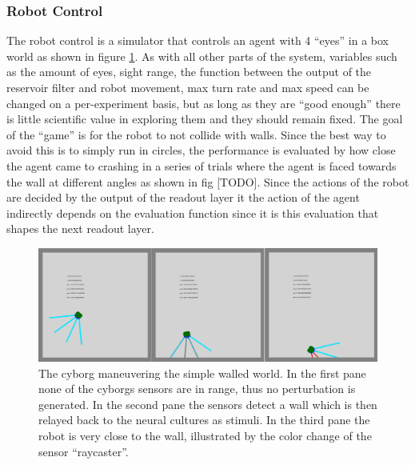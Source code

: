 \subsubsection{Robot Control}
The robot control is a simulator that controls an agent with 4 ``eyes'' in a box
world as shown in figure \ref{figGame}.
As with all other parts of the system, variables such as the amount of eyes, sight
range, the function between the output of the reservoir filter and robot
movement, max turn rate and max speed can be changed on a per-experiment basis,
but as long as they are ``good enough'' there is little scientific value in
exploring them and they should remain fixed.
The goal of the ``game'' is for the robot to not collide with walls.
Since the best way to avoid this is to simply run in circles, the performance is
evaluated by how close the agent came to crashing in a series of trials where
the agent is faced towards the wall at different angles as shown in fig [TODO].
Since the actions of the robot are decided by the output of the readout layer it
the action of the agent indirectly depends on the evaluation function since it
is this evaluation that shapes the next readout layer.
\begin{figure}[h!]
  \centering
  \includegraphics[width=1\textwidth]{fig/TAC/game2.png}
  \caption{
    The cyborg maneuvering the simple walled world. In the first pane none of
    the cyborgs sensors are in range, thus no perturbation is generated.
    In the second pane the sensors detect a wall which is then relayed back to
    the neural cultures as stimuli.
    In the third pane the robot is very close to the wall, illustrated by the
    color change of the sensor ``raycaster''.
  }
  \label{figGame}
\end{figure}
